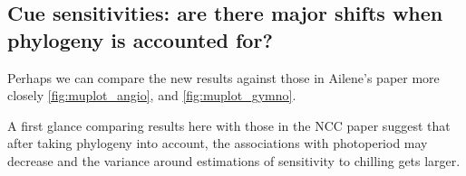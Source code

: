\documentclass{article}\usepackage[]{graphicx}\usepackage[]{color}
\begin{document}

\subsection*{Cue sensitivities: are there major shifts when phylogeny is accounted for?}

\item Perhaps we can compare the new results against those in Ailene's paper more closely \ref{fig:muplot_angio}, and \ref{fig:muplot_gymno}.

\item A first glance comparing results here with those in the NCC paper suggest that after taking phylogeny into account, the associations with photoperiod may decrease and the variance around estimations of sensitivity to chilling gets larger.
\end{document}
